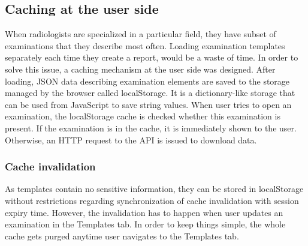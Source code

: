 \documentclass[12pt, twoside, openany]{report}
\theoremstyle{definition}
\begin{document}
\subsection{Caching at the user side}
When radiologists are specialized in a particular field, they have subset of examinations that they describe most often. Loading examination templates separately each time they create a report, would be a waste of time. In order to solve this issue, a caching mechanism at the user side was designed. After loading, JSON data describing examination elements are saved to the storage managed by the browser called localStorage. It is a dictionary-like storage that can be used from JavaScript to save string values. When user tries to open an examination, the localStorage cache is checked whether this examination is present. If the examination is in the cache, it is immediately shown to the user. Otherwise, an HTTP request to the API is issued to download data.

\subsubsection{Cache invalidation}
As templates contain no sensitive information, they can be stored in localStorage without restrictions regarding synchronization of cache invalidation with session expiry time. However, the invalidation has to happen when user updates an examination in the Templates tab. In order to keep things simple, the whole cache gets purged anytime user navigates to the Templates tab. 
\end{document}
